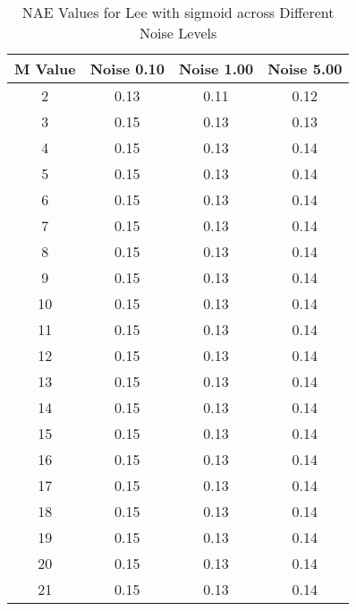 \begin{table}[htb]
\small
\centering
\begin{tabular}{|c|c|c|c|} \hline
M Value & Noise 0.10 & Noise 1.00 & Noise 5.00 \\ \hline
2 & 0.13 & 0.11 & 0.12 \\ \hline
3 & 0.15 & 0.13 & 0.13 \\ \hline
4 & 0.15 & 0.13 & 0.14 \\ \hline
5 & 0.15 & 0.13 & 0.14 \\ \hline
6 & 0.15 & 0.13 & 0.14 \\ \hline
7 & 0.15 & 0.13 & 0.14 \\ \hline
8 & 0.15 & 0.13 & 0.14 \\ \hline
9 & 0.15 & 0.13 & 0.14 \\ \hline
10 & 0.15 & 0.13 & 0.14 \\ \hline
11 & 0.15 & 0.13 & 0.14 \\ \hline
12 & 0.15 & 0.13 & 0.14 \\ \hline
13 & 0.15 & 0.13 & 0.14 \\ \hline
14 & 0.15 & 0.13 & 0.14 \\ \hline
15 & 0.15 & 0.13 & 0.14 \\ \hline
16 & 0.15 & 0.13 & 0.14 \\ \hline
17 & 0.15 & 0.13 & 0.14 \\ \hline
18 & 0.15 & 0.13 & 0.14 \\ \hline
19 & 0.15 & 0.13 & 0.14 \\ \hline
20 & 0.15 & 0.13 & 0.14 \\ \hline
21 & 0.15 & 0.13 & 0.14 \\ \hline
\end{tabular}
\caption{NAE Values for Lee with sigmoid across Different Noise Levels}
\end{table}

